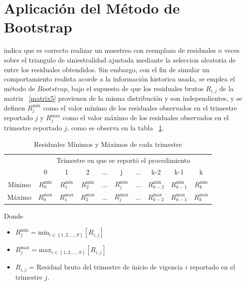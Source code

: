 \documentclass[11pt,twoside,openright,spanish]{report}
\numberwithin{equation}{chapter}
\numberwithin{figure}{chapter}
\numberwithin{table}{chapter}
\begin{document}
\section{Aplicación del Método de Bootstrap}
 
	 \citet{QLowe} indica que es correcto realizar un muestreo con reemplazo de residuales $n$ veces sobre el triangulo de siniestralidad ajustada mediante  la seleccion aleatoria de entre los residuales obtendidos. Sin embargo, con el fin de simular un comportamiento realista acorde a la información historica usada, se emplea el método de $Bootstrap$, bajo el supuesto de que los residuales brutos $R_{i,j}$ de la matriz ~\ref{matrix5} provienen de la misma distribución y son independientes, y se definen $R_{j}^{\text{min}}$ como el valor mínimo de los residuales observados en el trimestre reportado $j$ y $R_{j}^{\text{max}}$ como el valor máximo de los residuales observados en el trimestre reportado $j$, como se observa en la tabla ~\ref{matrix6}.
	
	\begin{table}[ht]
		\centering
		\begin{tabularx}{\linewidth}{ c|ccccccccc}
			& \multicolumn{9}{c}{Trimestre en que se reportó el procedimiento} \\
			& 0  & 1 & 2 & $ \dots $ & j & $\dots $ & k-2 & k-1 &  k\\
			\midrule
			Mínimo      &  $R_{0}^{\text{min}}$ & $R_{1}^{\text{min}}$ & $R_{2}^{\text{min}}$ & $ \dots $ & $R_{j}^{\text{min}}$ & $ \dots $ & $R_{k-2}^{\text{min}}$ & $R_{k-1}^{\text{min}}$ & $R_{k}^{\text{min}}$ \\
			Máximo      &  $R_{0}^{\text{max}}$ & $R_{1}^{\text{max}}$ & $R_{2}^{\text{max}}$ & $ \dots $ & $R_{j}^{\text{max}}$ & $ \dots $ & $R_{k-2}^{\text{max}}$ & $R_{k-1}^{\text{max}}$ & $R_{k}^{\text{max}}$ \\
		\end{tabularx}
	\caption{Residuales Mínimos y Máximos de cada trimestre}
	\label{matrix6}
	\end{table}
	
Donde
	
\begin{itemize}
	
	\setlength\itemsep{-0.5em}
	
	\item $R_{j}^{\text{min}}= \text{min}_{ i\in \left\{1,2,\dots ,S\right\}} \left[R_{i,j}^{}\right]$	
	
	\item $R_{j}^{\text{max}}= \text{max}_{ i\in \left\{1,2,\dots ,S\right\}} \left[R_{i,j}^{}\right]$
	
	\item $R_{i,j}$ = Residual bruto del trimestre de inicio de vigencia $i$ reportado en el trimestre $j$.
		
\end{itemize} 
\end{document}
